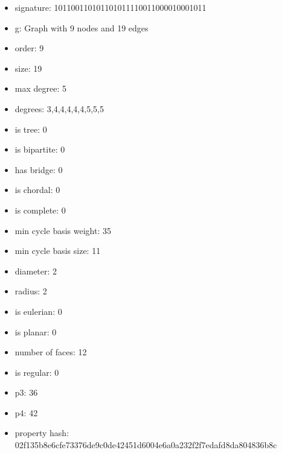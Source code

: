 \newpage
\begin{figure}
\end{figure}
\begin{itemize}
\item signature: 101100110101101011110011000010001011
\item g: Graph with 9 nodes and 19 edges
\item order: 9
\item size: 19
\item max degree: 5
\item degrees: 3,4,4,4,4,4,5,5,5
\item is tree: 0
\item is bipartite: 0
\item has bridge: 0
\item is chordal: 0
\item is complete: 0
\item min cycle basis weight: 35
\item min cycle basis size: 11
\item diameter: 2
\item radius: 2
\item is eulerian: 0
\item is planar: 0
\item number of faces: 12
\item is regular: 0
\item p3: 36
\item p4: 42
\item property hash: 02f135b8e6cfe73376de9c0de42451d6004e6a0a232f2f7edafd8da804836b8c
\end{itemize}
